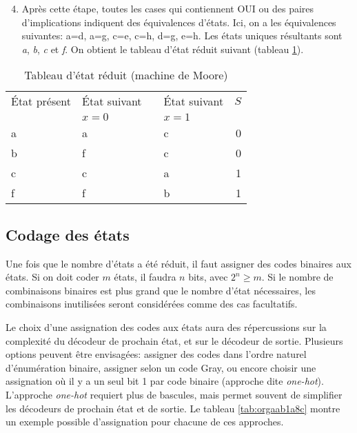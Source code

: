 \documentclass[11pt]{article}
\begin{document}
\begin{enumerate}
\setcounter{enumi}{3}
\item Après cette étape, toutes les  cases qui contiennent OUI ou des
paires d'implications indiquent des équivalences d'états. Ici, on a
les équivalences suivantes: a=d, a=g, c=e, c=h, d=g, e=h. Les états
uniques résultants sont \emph{a}, \emph{b}, \emph{c} et \emph{f}. On obtient le tableau
d'état réduit suivant (tableau \ref{tab:orgaf9df9c}).
\end{enumerate}

\begin{table}[htbp]
\caption{\label{tab:orgaf9df9c}Tableau d'état réduit (machine de Moore)}
\centering
\begin{tabular}{llllr}
État présent & État suivant &  & État suivant & \(S\)\\
 & \(x=0\) &  & \(x=1\) & \\
\hline
a & a &  & c & 0\\
b & f &  & c & 0\\
c & c &  & a & 1\\
f & f &  & b & 1\\
\end{tabular}
\end{table}


\subsection{Codage des états}
\label{sec:org8f59f2e}

Une fois que le nombre d'états a été réduit, il faut assigner des
codes binaires aux états. Si on doit coder \(m\) états, il faudra
\(n\) bits, avec \(2^n \geq m\). Si le nombre de combinaisons
binaires est plus grand que le nombre d'état nécessaires, les
combinaisons inutilisées seront considérées comme des cas facultatifs.

Le choix d'une assignation des codes aux états aura des répercussions
sur la complexité du décodeur de prochain état, et sur le décodeur de
sortie. Plusieurs options peuvent être envisagées: assigner des codes
dans l'ordre naturel d'énumération binaire, assigner selon un code
Gray, ou encore choisir une assignation où il y a un seul bit 1 par
code binaire (approche dite \emph{one-hot}). L'approche \emph{one-hot} requiert
plus de bascules, mais permet souvent de simplifier les décodeurs de
prochain état et de sortie. Le tableau \ref{tab:orgaab1a8c} montre
un exemple possible d'assignation pour chacune de ces approches.
\end{document}
